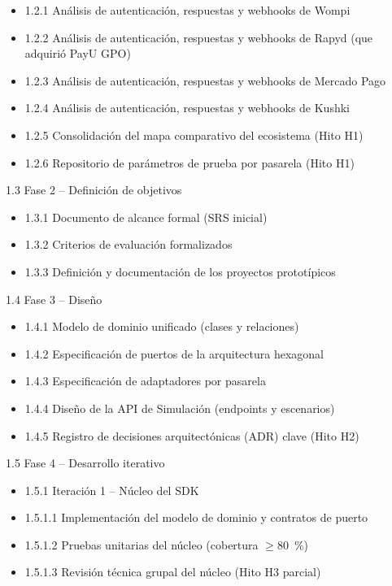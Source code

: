 \begin{itemize}
  \item 1.2.1 Análisis de autenticación, respuestas y webhooks de Wompi
  \item 1.2.2 Análisis de autenticación, respuestas y webhooks de Rapyd (que adquirió PayU GPO)
  \item 1.2.3 Análisis de autenticación, respuestas y webhooks de Mercado Pago
  \item 1.2.4 Análisis de autenticación, respuestas y webhooks de Kushki
  \item 1.2.5 Consolidación del mapa comparativo del ecosistema (Hito H1)
  \item 1.2.6 Repositorio de parámetros de prueba por pasarela (Hito H1)
\end{itemize}

1.3 Fase 2 – Definición de objetivos

\begin{itemize}
  \item 1.3.1 Documento de alcance formal (SRS inicial)
  \item 1.3.2 Criterios de evaluación formalizados
  \item 1.3.3 Definición y documentación de los proyectos prototípicos
\end{itemize}

1.4 Fase 3 – Diseño

\begin{itemize}
  \item 1.4.1 Modelo de dominio unificado (clases y relaciones)
  \item 1.4.2 Especificación de puertos de la arquitectura hexagonal
  \item 1.4.3 Especificación de adaptadores por pasarela
  \item 1.4.4 Diseño de la API de Simulación (endpoints y escenarios)
  \item 1.4.5 Registro de decisiones arquitectónicas (ADR) clave (Hito H2)
\end{itemize}

1.5 Fase 4 – Desarrollo iterativo

\begin{itemize}
  \item 1.5.1 Iteración 1 – Núcleo del SDK
  \item 1.5.1.1 Implementación del modelo de dominio y contratos de puerto
  \item 1.5.1.2 Pruebas unitarias del núcleo (cobertura $\geq 80$~\%)
  \item 1.5.1.3 Revisión técnica grupal del núcleo (Hito H3 parcial)
\end{itemize}

